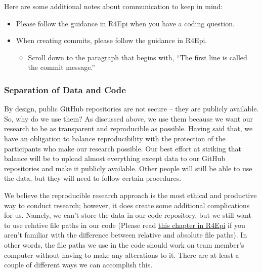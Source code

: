 \documentclass[
  letterpaper,
  DIV=11,
  numbers=noendperiod]{scrreprt}
\providecommand{\tightlist}{%
  \setlength{\itemsep}{0pt}\setlength{\parskip}{0pt}}\usepackage{longtable,booktabs,array}
\begin{document}
Here are some additional notes about communication to keep in mind:

\begin{itemize}
\tightlist
\item
  Please follow the guidance in R4Epi when you have a coding question.
\item
  When creating commits, please follow the guidance in R4Epi.

  \begin{itemize}
  \tightlist
  \item
    Scroll down to the paragraph that begins with, ``The first line is
    called the commit message.''
  \end{itemize}
\end{itemize}

\subsubsection{Separation of Data and
Code}\label{separation-of-data-and-code}

By design, public GitHub repositories are not secure -- they are
publicly available. So, why do we use them? As discussed above, we use
them because we want our research to be as transparent and reproducible
as possible. Having said that, we have an obligation to balance
reproducibility with the protection of the participants who make our
research possible. Our best effort at striking that balance will be to
upload almost everything {except data} to our GitHub repositories and
make it publicly available. Other people will still be able to use the
data, but they will need to follow certain procedures.

We believe the reproducible research approach is the most ethical and
productive way to conduct research; however, it does create some
additional complications for us. Namely, we can't store the data in our
code repository, but we still want to use relative file paths in our
code (Please read \href{https://www.r4epi.com/r-projects.html}{this
chapter in R4Epi} if you aren't familiar with the difference between
relative and absolute file paths). In other words, the file paths we use
in the code should work on team member's computer without having to make
any alterations to it. There are at least a couple of different ways we
can accomplish this.
\end{document}
